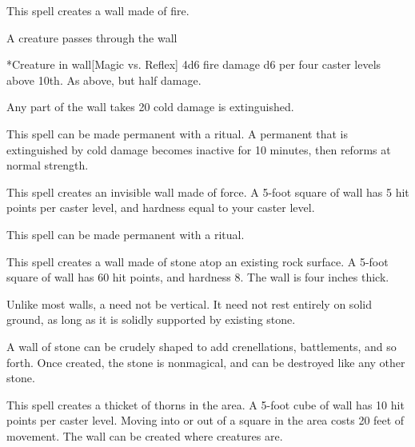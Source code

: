 \spelldur{\durshort}
\spellline
\spelleffect This spell creates a wall made of fire.
\begin{spelltrigger}{A creature passes through the wall}
    \begin{spelltarget}*{Creature in wall}[Magic vs. Reflex]
        \spellsuccess 4d6 fire damage \add d6 per four caster levels above 10th.
        \spellfailure As above, but half damage.
    \end{spelltarget}
\end{spelltrigger}
\spellnotes Any part of the wall takes 20 cold damage is extinguished.

This spell can be made permanent with a  ritual. A permanent  that is extinguished by cold damage becomes inactive for 10 minutes, then reforms at normal strength.

\spelldur{\durshort \dismissable}
\spellline
\spelleffect This spell creates an invisible wall made of force. A 5-foot square of wall has 5 hit points per caster level, and hardness equal to your caster level.
\spellnotes \forcespellnotes

This spell can be made permanent with a  ritual.

\spellline
\spelleffect This spell creates a wall made of stone atop an existing rock surface. A 5-foot square of wall has 60 hit points, and hardness 8. The wall is four inches thick.
\par Unlike most walls, a  need not be vertical. It need not rest entirely on solid ground, as long as it is solidly supported by existing stone.
\par A wall of stone can be crudely shaped to add crenellations, battlements, and so forth.
\spellnotes Once created, the stone is nonmagical, and can be destroyed like any other stone.

\spelldur{\durlong \dismissable}
\spelleffect This spell creates a thicket of thorns in the area. A 5-foot cube of wall has 10 hit points per caster level. Moving into or out of a square in the area costs 20 feet of movement. The wall can be created where creatures are.

